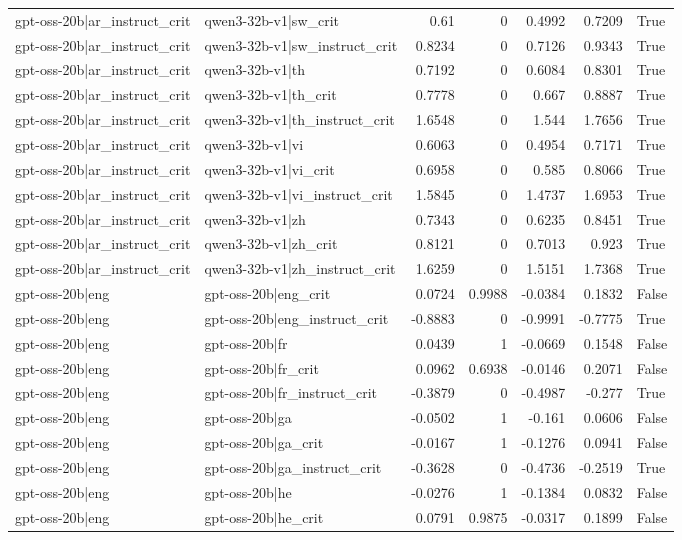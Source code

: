 \begin{table}
\begin{tabular}{l l r r r r l}
gpt-oss-20b|ar_instruct_crit & qwen3-32b-v1|sw_crit & 0.61 & 0 & 0.4992 & 0.7209 & True \\
gpt-oss-20b|ar_instruct_crit & qwen3-32b-v1|sw_instruct_crit & 0.8234 & 0 & 0.7126 & 0.9343 & True \\
gpt-oss-20b|ar_instruct_crit & qwen3-32b-v1|th & 0.7192 & 0 & 0.6084 & 0.8301 & True \\
gpt-oss-20b|ar_instruct_crit & qwen3-32b-v1|th_crit & 0.7778 & 0 & 0.667 & 0.8887 & True \\
gpt-oss-20b|ar_instruct_crit & qwen3-32b-v1|th_instruct_crit & 1.6548 & 0 & 1.544 & 1.7656 & True \\
gpt-oss-20b|ar_instruct_crit & qwen3-32b-v1|vi & 0.6063 & 0 & 0.4954 & 0.7171 & True \\
gpt-oss-20b|ar_instruct_crit & qwen3-32b-v1|vi_crit & 0.6958 & 0 & 0.585 & 0.8066 & True \\
gpt-oss-20b|ar_instruct_crit & qwen3-32b-v1|vi_instruct_crit & 1.5845 & 0 & 1.4737 & 1.6953 & True \\
gpt-oss-20b|ar_instruct_crit & qwen3-32b-v1|zh & 0.7343 & 0 & 0.6235 & 0.8451 & True \\
gpt-oss-20b|ar_instruct_crit & qwen3-32b-v1|zh_crit & 0.8121 & 0 & 0.7013 & 0.923 & True \\
gpt-oss-20b|ar_instruct_crit & qwen3-32b-v1|zh_instruct_crit & 1.6259 & 0 & 1.5151 & 1.7368 & True \\
gpt-oss-20b|eng & gpt-oss-20b|eng_crit & 0.0724 & 0.9988 & -0.0384 & 0.1832 & False \\
gpt-oss-20b|eng & gpt-oss-20b|eng_instruct_crit & -0.8883 & 0 & -0.9991 & -0.7775 & True \\
gpt-oss-20b|eng & gpt-oss-20b|fr & 0.0439 & 1 & -0.0669 & 0.1548 & False \\
gpt-oss-20b|eng & gpt-oss-20b|fr_crit & 0.0962 & 0.6938 & -0.0146 & 0.2071 & False \\
gpt-oss-20b|eng & gpt-oss-20b|fr_instruct_crit & -0.3879 & 0 & -0.4987 & -0.277 & True \\
gpt-oss-20b|eng & gpt-oss-20b|ga & -0.0502 & 1 & -0.161 & 0.0606 & False \\
gpt-oss-20b|eng & gpt-oss-20b|ga_crit & -0.0167 & 1 & -0.1276 & 0.0941 & False \\
gpt-oss-20b|eng & gpt-oss-20b|ga_instruct_crit & -0.3628 & 0 & -0.4736 & -0.2519 & True \\
gpt-oss-20b|eng & gpt-oss-20b|he & -0.0276 & 1 & -0.1384 & 0.0832 & False \\
gpt-oss-20b|eng & gpt-oss-20b|he_crit & 0.0791 & 0.9875 & -0.0317 & 0.1899 & False \\

\end{tabular}
\end{table}
